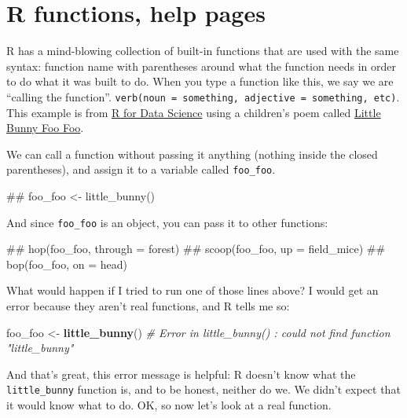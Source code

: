 \documentclass[]{book}
\newenvironment{Shaded}{\begin{snugshade}}{\end{snugshade}}
\newcommand{\KeywordTok}[1]{\textcolor[rgb]{0.13,0.29,0.53}{\textbf{#1}}}
\newcommand{\StringTok}[1]{\textcolor[rgb]{0.31,0.60,0.02}{#1}}
\newcommand{\CommentTok}[1]{\textcolor[rgb]{0.56,0.35,0.01}{\textit{#1}}}
\newcommand{\NormalTok}[1]{#1}
\theoremstyle{definition}
\theoremstyle{definition}
\theoremstyle{definition}
\theoremstyle{remark}
\begin{document}
\section{R functions, help pages}\label{r-functions-help-pages}

R has a mind-blowing collection of built-in functions that are used with
the same syntax: function name with parentheses around what the function
needs in order to do what it was built to do. When you type a function
like this, we say we are ``calling the function''.
\texttt{verb(noun\ =\ something,\ adjective\ =\ something,\ etc)}. This
example is from \href{http://r4ds.had.co.nz/pipes}{R for Data Science}
using a children's poem called
\href{https://en.wikipedia.org/wiki/Little_Bunny_Foo_Foo}{Little Bunny
Foo Foo}.

We can call a function without passing it anything (nothing inside the
closed parentheses), and assign it to a variable called
\texttt{foo\_foo}.

\begin{Shaded}
\begin{Highlighting}[]
\NormalTok{## foo_foo <- little_bunny()}
\end{Highlighting}
\end{Shaded}

And since \texttt{foo\_foo} is an object, you can pass it to other
functions:

\begin{Shaded}
\begin{Highlighting}[]
\NormalTok{## hop(foo_foo, through = forest) }
\NormalTok{## scoop(foo_foo, up = field_mice) }
\NormalTok{## bop(foo_foo, on = head)}
\end{Highlighting}
\end{Shaded}

What would happen if I tried to run one of those lines above? I would
get an error because they aren't real functions, and R tells me so:

\begin{Shaded}
\begin{Highlighting}[]
\NormalTok{foo_foo <-}\StringTok{ }\KeywordTok{little_bunny}\NormalTok{()}
\CommentTok{# Error in little_bunny() : could not find function "little_bunny"}
\end{Highlighting}
\end{Shaded}

And that's great, this error message is helpful: R doesn't know what the
\texttt{little\_bunny} function is, and to be honest, neither do we. We
didn't expect that it would know what to do. OK, so now let's look at a
real function.
\end{document}
